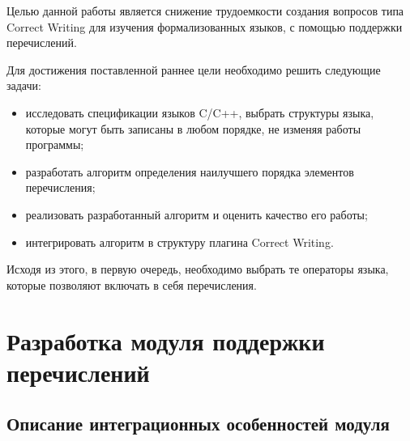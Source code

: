 \documentclass[a4paper,english,russian]{G2-105}
\begin{document}
\par Целью данной работы является снижение трудоемкости создания вопросов типа Correct Writing для изучения формализованных языков, с помощью поддержки перечислений.
\par Для достижения поставленной раннее цели необходимо решить следующие задачи:
\begin{itemize}
    \item исследовать спецификации языков C/C++, выбрать структуры языка, которые могут быть записаны в любом порядке, не изменяя работы программы;
    \item разработать алгоритм определения наилучшего порядка элементов перечисления;
    \item реализовать разработанный алгоритм и оценить качество его работы;
    \item интегрировать алгоритм в структуру плагина Correct Writing.
\end{itemize}
\par Исходя из этого, в первую очередь, необходимо выбрать те операторы языка, которые позволяют включать в себя перечисления. 

\chapter{Разработка модуля поддержки перечислений}
\ttl
\section{Описание интеграционных особенностей модуля}
\end{document}
